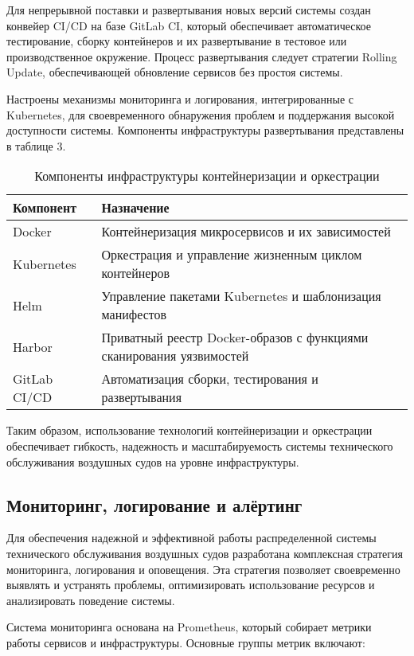 \documentclass[14pt,a4paper]{extarticle}
\begin{document}
Для непрерывной поставки и развертывания новых версий системы создан конвейер CI/CD на базе GitLab CI, который обеспечивает автоматическое тестирование, сборку контейнеров и их развертывание в тестовое или производственное окружение. Процесс развертывания следует стратегии Rolling Update, обеспечивающей обновление сервисов без простоя системы.

Настроены механизмы мониторинга и логирования, интегрированные с Kubernetes, для своевременного обнаружения проблем и поддержания высокой доступности системы. Компоненты инфраструктуры развертывания представлены в таблице 3.

\begin{table}[h]
\caption{Компоненты инфраструктуры контейнеризации и оркестрации}
\begin{tabular}{|p{4cm}|p{10cm}|}
\hline
\textbf{Компонент} & \textbf{Назначение} \\
\hline
Docker & Контейнеризация микросервисов и их зависимостей \\
\hline
Kubernetes & Оркестрация и управление жизненным циклом контейнеров \\
\hline
Helm & Управление пакетами Kubernetes и шаблонизация манифестов \\
\hline
Harbor & Приватный реестр Docker-образов с функциями сканирования уязвимостей \\
\hline
GitLab CI/CD & Автоматизация сборки, тестирования и развертывания \\
\hline
\end{tabular}
\end{table}

Таким образом, использование технологий контейнеризации и оркестрации обеспечивает гибкость, надежность и масштабируемость системы технического обслуживания воздушных судов на уровне инфраструктуры.

\subsection{Мониторинг, логирование и алёртинг}

Для обеспечения надежной и эффективной работы распределенной системы технического обслуживания воздушных судов разработана комплексная стратегия мониторинга, логирования и оповещения. Эта стратегия позволяет своевременно выявлять и устранять проблемы, оптимизировать использование ресурсов и анализировать поведение системы.

Система мониторинга основана на Prometheus, который собирает метрики работы сервисов и инфраструктуры. Основные группы метрик включают:
\end{document}
